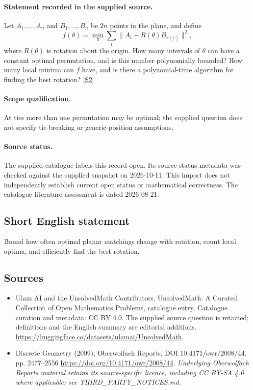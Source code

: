 \documentclass[11pt]{article}
\begin{document}
\paragraph{Statement recorded in the supplied source.}
Let $A_1,\ldots,A_n$ and $B_1,\ldots,B_n$ be $2n$ points in the plane, and define $$f(\theta)=\min_{\pi}\sum_i\|A_i-R(\theta)B_{\pi(i)}\|^2,$$ where $R(\theta)$ is rotation about the origin. How many intervals of $\theta$ can have a constant optimal permutation, and is this number polynomially bounded? How many local minima can $f$ have, and is there a polynomial-time algorithm for finding the best rotation? \href{https://doi.org/10.4171/owr/2008/44}{[S2]}
\paragraph{Scope qualification.}
At ties more than one permutation may be optimal; the supplied question does not specify tie-breaking or generic-position assumptions.
\paragraph{Source status.}
The supplied catalogue labels this record open. Its source-status metadata was checked against the supplied snapshot on 2026-10-11. This import does not independently establish current open status or mathematical correctness. The catalogue literature assessment is dated 2026-08-21.
\subsection{Short English statement}
Bound how often optimal planar matchings change with rotation, count local optima, and efficiently find the best rotation.
\subsection{Sources}
\begin{itemize}
\item[S1] Ulam AI and the UnsolvedMath Contributors, UnsolvedMath: A Curated Collection of Open Mathematics Problems, catalogue entry. Catalogue curation and metadata: CC BY 4.0. The supplied source question is retained; definitions and the English summary are editorial additions.
\url{https://huggingface.co/datasets/ulamai/UnsolvedMath}.
\item[S2] Discrete Geometry (2009), Oberwolfach Reports, DOI 10.4171/owr/2008/44, pp. 2477--2556
\url{https://doi.org/10.4171/owr/2008/44}.
\textit{Underlying Oberwolfach Reports material retains its source-specific licence, including CC BY-SA 4.0 where applicable; see THIRD\_PARTY\_NOTICES.md.}
\end{itemize}
\end{document}
